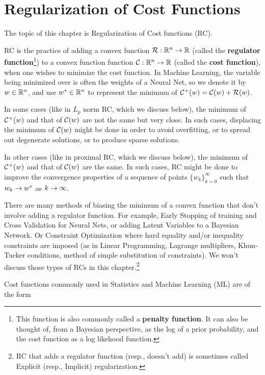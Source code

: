 \chapter{Regularization of Cost Functions}
\label{ch-regularization}


 The topic
 of this chapter is Regularization of Cost functions (RC).

RC is the practice of adding 
a convex function  ${\cal R}:{ \mathbb{R}}^n\rightarrow { \mathbb{R}}$
(called the {\bf regulator function}\footnote{This function is also commonly called a {\bf penalty function}.
It can  also be thought  of, from a Bayesian perspective,
as the log of a prior probability, and the cost function as a log likehood function.}) to
a convex function  function ${\cal C}:{ \mathbb{R}}^n\rightarrow { \mathbb{R}}$
(called the {\bf  cost function}), when one
wishes to minimize the cost function. In Machine Learning,
the variable being minimized over is often the weights 
of a Neural Net, so we denote it by $w\in { \mathbb{R}}^n$, and use $w^*\in { \mathbb{R}}^n$
to represent the
minimum of ${\cal C}^+(w) ={\cal C}(w)+ {\cal R}(w)$. 

In some cases (like in $L_p$ norm RC,
which we discuss below),
the minimum of ${\cal C}^+(w)$
and that of ${\cal C}(w)$
are not the same but very close. In such cases,
displacing the minimum of 
${\cal C}(w)$ 
might be done in order
to avoid overfitting, or
to spread out degenerate solutions, or to produce
sparse solutions. 

In other cases (like in proximal RC, which we discuss below),
the minimum of ${\cal C}^+(w)$
and that of ${\cal C}(w)$
are the  same. 
In such cases, RC might be done
to improve the
convergence properties
of a sequence of points
$\{w_k\}_{k=0}^\infty$
such that $w_k\rightarrow w^*$
as $k
\rightarrow \infty$.

There are many methods
of biasing the 
minimum of a convex function that  don't
involve adding a regulator
function.
For example, Early Stopping
of training 
and Cross Validation for Neural Nets,
or adding Latent Variables
to a Bayesian Network.
Or Constraint Optimization where hard equality and/or inequality constraints are imposed (as in Linear Programming,
Lagrange multipliers, Khun-Tucker conditions, method of simple substitution of constraints).
We won't discuss those types of
RCs in this chapter.\footnote{RC that adds a regulator function (resp., doesn't add)
is sometimes called Explicit (resp., Implicit)
regularization.}



Cost functions commonly used in Statistics and
Machine Learning (ML) are of the form


